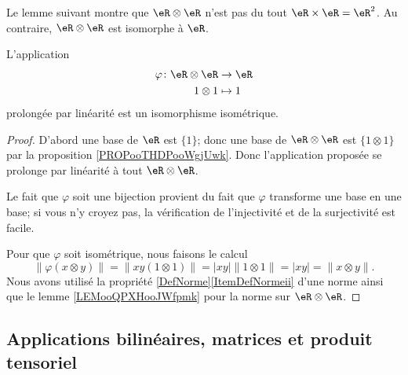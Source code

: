 Le lemme suivant montre que \( \eR\otimes \eR\) n'est pas du tout \( \eR\times \eR=\eR^2\). Au contraire, \( \eR\otimes \eR\) est isomorphe à \( \eR\).
\begin{lemma}        \label{LEMooVONEooQpPgcn}
	L'application
	\begin{equation}
		\begin{aligned}
			\varphi\colon \eR\otimes \eR & \to \eR   \\
			1\otimes 1                   & \mapsto 1
		\end{aligned}
	\end{equation}
	prolongée par linéarité est un isomorphisme isométrique.
\end{lemma}

\begin{proof}
	D'abord une base de \( \eR\) est \( \{ 1 \}\); donc une base de \( \eR\otimes \eR\) est \( \{ 1\otimes 1 \}\) par la proposition \ref{PROPooTHDPooWgjUwk}. Donc l'application proposée se prolonge par linéarité à tout \( \eR\otimes \eR\).

	Le fait que \( \varphi\) soit une bijection provient du fait que \( \varphi\) transforme une base en une base; si vous n'y croyez pas, la vérification de l'injectivité et de la surjectivité est facile.

	Pour que \( \varphi\) soit isométrique, nous faisons le calcul
	\begin{equation}
		\| \varphi(x\otimes y) \|=\| xy(1\otimes 1) \|=| xy |\| 1\otimes 1 \|=| xy |=\| x\otimes y \|.
	\end{equation}
	Nous avons utilisé la propriété \ref{DefNorme}\ref{ItemDefNormeii} d'une norme ainsi que le lemme \ref{LEMooQPXHooJWfpmk} pour la norme sur \( \eR\otimes \eR\).
\end{proof}

\subsection{Applications bilinéaires, matrices et produit tensoriel}
\label{SECooUKRYooZjagcX}

